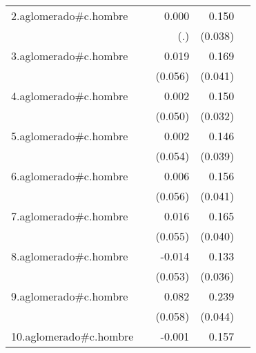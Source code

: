 {\begin{longtable}{l*{4}{D{.}{.}{-1}}}
\addlinespace
2.aglomerado#c.hombre&                     &       0.000         &       0.150\sym{***}&                     \\
            &                     &         (.)         &     (0.038)         &                     \\
\addlinespace
3.aglomerado#c.hombre&                     &       0.019         &       0.169\sym{***}&                     \\
            &                     &     (0.056)         &     (0.041)         &                     \\
\addlinespace
4.aglomerado#c.hombre&                     &       0.002         &       0.150\sym{***}&                     \\
            &                     &     (0.050)         &     (0.032)         &                     \\
\addlinespace
5.aglomerado#c.hombre&                     &       0.002         &       0.146\sym{***}&                     \\
            &                     &     (0.054)         &     (0.039)         &                     \\
\addlinespace
6.aglomerado#c.hombre&                     &       0.006         &       0.156\sym{***}&                     \\
            &                     &     (0.056)         &     (0.041)         &                     \\
\addlinespace
7.aglomerado#c.hombre&                     &       0.016         &       0.165\sym{***}&                     \\
            &                     &     (0.055)         &     (0.040)         &                     \\
\addlinespace
8.aglomerado#c.hombre&                     &      -0.014         &       0.133\sym{***}&                     \\
            &                     &     (0.053)         &     (0.036)         &                     \\
\addlinespace
9.aglomerado#c.hombre&                     &       0.082         &       0.239\sym{***}&                     \\
            &                     &     (0.058)         &     (0.044)         &                     \\
\addlinespace
10.aglomerado#c.hombre&                     &      -0.001         &       0.157\sym{***}&                     \\

\end{longtable}}
